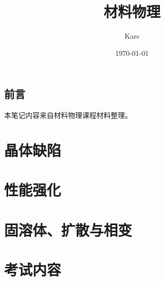 \documentclass[12pt]{book}
\title{材料物理}
\author{Kars}
\date{\today}
\numberwithin{equation}{section}
\begin{document}
\maketitle



\tableofcontents
{}

\clearpage
\chapter*{前言}
	本笔记内容来自材料物理课程材料整理。


\part{晶体缺陷}
	
	
	
\part{性能强化}
	
	
	
\part{固溶体、扩散与相变}
	
	
	
\part{考试内容}
	
\printindex
\end{document}
